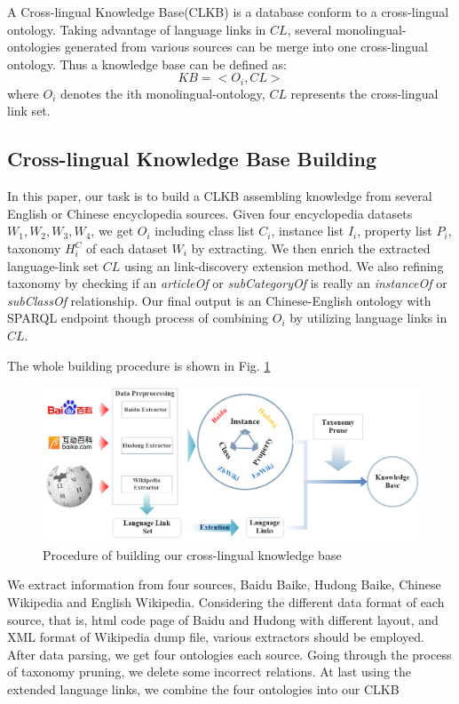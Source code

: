 \documentclass[runningheads,a4paper]{llncs}
\begin{document}
A Cross-lingual Knowledge Base(CLKB) is a database conform to a cross-lingual ontology. Taking advantage of language links in $CL$, several monolingual-ontologies generated from various sources can be merge into one cross-lingual ontology.  Thus a knowledge base can be defined as:
\begin{equation}
    KB = <O_{i}, CL>
\end{equation}
where $O_{i}$ denotes the ith monolingual-ontology, $CL$ represents the cross-lingual link set.

\subsection{Cross-lingual Knowledge Base Building}

In this paper, our task is to build a CLKB assembling knowledge from several English or Chinese encyclopedia sources. Given four encyclopedia datasets $W_{1},W_{2},W_{3},W_{4}$, we get $O_{i}$ including class list $C_{i}$, instance list $I_{i}$, property list $P_{i}$, taxonomy $H^C_{i}$ of each dataset $W_{i}$ by extracting. We then enrich the extracted language-link set $CL$ using an link-discovery extension method. We also refining taxonomy by checking if an \textit{articleOf} or \textit{subCategoryOf} is really an \textit{instanceOf} or \textit{subClassOf} relationship. Our final output is an Chinese-English ontology  with SPARQL endpoint though process of combining $O_{i}$ by utilizing language links in $CL$.

The whole building procedure is shown in Fig. \ref{fig:procedure}
\begin{figure}[ht]
    \centerline{\includegraphics[width=1\columnwidth]{fig/procedure2}}
    \caption{Procedure of building our cross-lingual knowledge base}
    \label{fig:procedure}
\end{figure}%
We extract information from four sources, Baidu Baike, Hudong Baike, Chinese Wikipedia and English Wikipedia. Considering the different data format of each source, that is, html code page of Baidu and Hudong with different layout, and XML format of Wikipedia dump file, various extractors should be employed. After data parsing, we get four ontologies each source. Going through the process of taxonomy pruning, we delete some incorrect relations. At last using the extended language links, we combine the four ontologies into our CLKB
\end{document}
